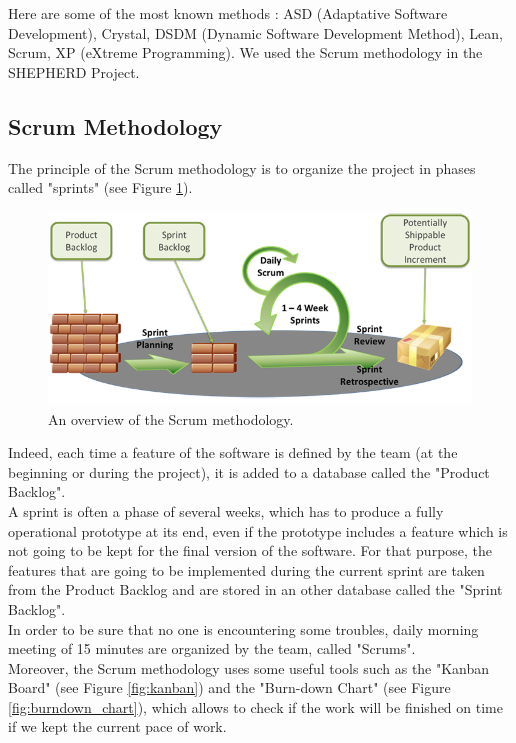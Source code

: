 \documentclass[a4paper]{report}
\begin{document}
Here are some of the most known methods : ASD (Adaptative Software Development), Crystal, DSDM (Dynamic Software Development Method), Lean, Scrum, XP (eXtreme Programming). We used the Scrum methodology in the SHEPHERD Project.\\

\subsection{Scrum Methodology}

The principle of the Scrum methodology is to organize the project in phases called "sprints" (see Figure \ref{fig:scrum_overview}).\\ 

\begin{figure}[H]
	\centering
	\includegraphics[width=0.7\linewidth]{image/SCRUM-overview-resize.png}
	\caption{An overview of the Scrum methodology.}
	\label{fig:scrum_overview}
\end{figure}

\vspace{1cm}
Indeed, each time a feature of the software is defined by the team (at the beginning or during the project), it is added to a database called the "Product Backlog". \\

A sprint is often a phase of several weeks, which has to produce a fully operational prototype at its end, even if the prototype includes a feature which is not going to be kept for the final version of the software. For that purpose, the features that are going to be implemented during the current sprint are taken from the Product Backlog and are stored in an other database called the "Sprint Backlog".\\

In order to be sure that no one is encountering some troubles, daily morning meeting of 15 minutes are organized by the team, called "Scrums".\\

Moreover, the Scrum methodology uses some useful tools such as the "Kanban Board" (see Figure \ref{fig:kanban}) and the "Burn-down Chart" (see Figure \ref{fig:burndown_chart}), which allows to check if the work will be finished on time if we kept the current pace of work.\\
\end{document}
